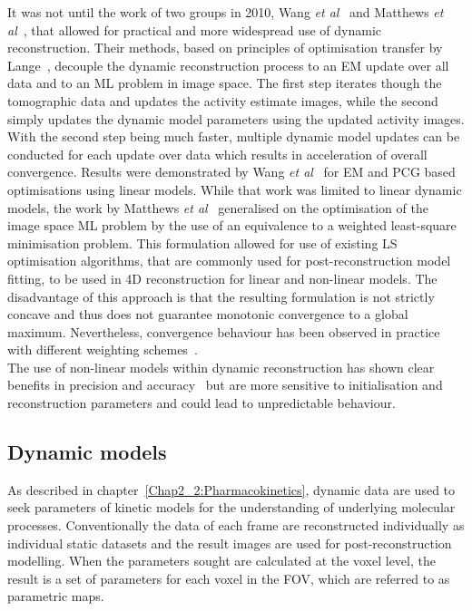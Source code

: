 It was not until the work of two groups in 2010, Wang \textit{et al}~\cite{Wang2010} and Matthews \textit{et al}~\cite{Matthews2010}, that allowed for practical and more widespread use of dynamic reconstruction. Their methods, based on principles of optimisation transfer by Lange~\cite{Lange2000}, decouple the dynamic reconstruction process to an EM update over all data and to an ML problem in image space. The first step iterates though the tomographic data and updates the activity estimate images, while the second simply updates the dynamic model parameters using the updated activity images. With the second step being much faster, multiple dynamic model updates can be conducted for each update over data which results in acceleration of overall convergence. Results were demonstrated by Wang \textit{et al}~\cite{Wang2010} for EM and PCG based optimisations using linear models. While that work was limited to linear dynamic models, the work by Matthews \textit{et al}~\cite{Matthews2010} generalised on the optimisation of the image space ML problem by the use of an equivalence to a weighted least-square minimisation problem. This formulation allowed for use of existing LS optimisation algorithms, that are commonly used for post-reconstruction model fitting, to be used in 4D reconstruction for linear and non-linear models. The disadvantage of this approach is that the resulting formulation is not strictly concave and thus does not guarantee monotonic convergence to a global maximum. Nevertheless, convergence behaviour has been observed in practice with different weighting schemes~\cite{Gravel2015,Wang2013}. \\
The use of non-linear models within dynamic reconstruction has shown clear benefits in precision and accuracy~\cite{Angelis2014,Kotasidis2012,Gravel2015} but are more sensitive to initialisation and reconstruction parameters and could lead to unpredictable behaviour.

\subsection{Dynamic models}
As described in chapter~\ref{Chap2_2:Pharmacokinetics}, dynamic data are used to seek parameters of kinetic models for the understanding of underlying molecular processes. Conventionally the data of each frame are reconstructed individually as individual static datasets and the result images are used for post-reconstruction modelling. When the parameters sought are calculated at the voxel level, the result is a set of parameters for each voxel in the FOV, which are referred to as parametric maps.


